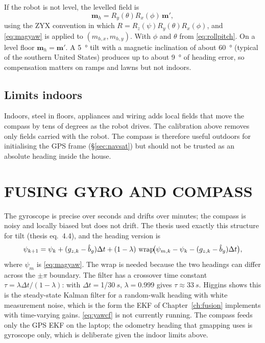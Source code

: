 If the robot is not level, the levelled field is
\begin{equation}
\bm m_h = R_y(\theta)R_x(\phi)\,\bm m',
\end{equation}
using the ZYX convention in which $R=R_z(\psi)R_y(\theta)R_x(\phi)$, and
\eqref{eq:magyaw} is applied to $(m_{h,x},m_{h,y})$. With $\phi$ and $\theta$
from \eqref{eq:rollpitch}. On a level floor $\bm m_h=\bm m'$. A \SI{5}{\degree}
tilt with a magnetic inclination of about \SI{60}{\degree} (typical of the
southern United States) produces up to about \SI{9}{\degree} of heading error,
so compensation matters on ramps and lawns but not indoors.

\subsection{Limits indoors}

Indoors, steel in floors, appliances and wiring adds local fields that move
the compass by tens of degrees as the robot drives. The calibration above
removes only fields carried with the robot. The compass is therefore useful
outdoors for initialising the GPS frame (\S\ref{sec:navsat}) but should not
be trusted as an absolute heading inside the house.

\section{FUSING GYRO AND COMPASS}
\label{sec:compfilt}

The gyroscope is precise over seconds and drifts over minutes; the compass is
noisy and locally biased but does not drift. The thesis used exactly this
structure for tilt (thesis eq.~4.4), and the heading version is
\begin{equation}\label{eq:yawcf}
\psi_{k+1} = \psi_k + (g_{z,k}-\hat b_g)\Delta t
  + (1-\lambda)\,\operatorname{wrap}\!\bigl(\psi_{m,k}-\psi_k-(g_{z,k}-\hat b_g)\Delta t\bigr),
\end{equation}
where $\psi_m$ is \eqref{eq:magyaw}. The wrap is needed because the two
headings can differ across the $\pm\pi$ boundary. The filter has a crossover
time constant $\tau=\lambda\Delta t/(1-\lambda)$: with $\Delta t=$1/30$~s$,
$\lambda=0.999$ gives $\tau\approx\SI{33}{s}$. Higgins \cite{higgins1975comparison}
shows this is the steady-state Kalman filter for a random-walk heading with
white measurement noise, which is the form the EKF of
Chapter~\ref{ch:fusion} implements with time-varying gains.
\eqref{eq:yawcf} is not currently running. The compass feeds only the GPS
EKF on the laptop; the odometry heading that gmapping uses is gyroscope only,
which is deliberate given the indoor limits above.
